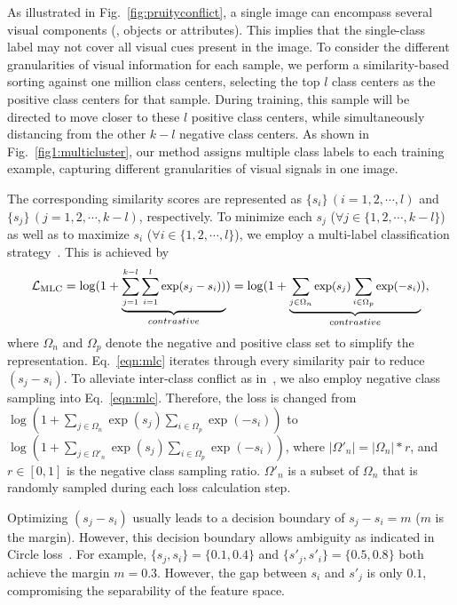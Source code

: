 As illustrated in Fig.~\ref{fig:pruityconflict}, a single image can encompass several visual components (\eg, objects or attributes). This implies that the single-class label may not cover all visual cues present in the image. 
To consider the different granularities of visual information
for each sample, we perform a similarity-based sorting against one million class centers, selecting the top $l$ class centers as the positive class centers for that sample. 
During training, this sample will be directed to move closer to these $l$ positive class centers, while simultaneously distancing from the other $k-l$ negative class centers. 
As shown in Fig.~\ref{fig1:multicluster}, our method assigns multiple class labels to each training example, capturing different granularities of visual signals in one image.

The corresponding similarity scores are represented as $\{s_i\}\, (i=1,2,\cdots,l)$ and $\{s_j\}\,(j=1,2,\cdots,k-l)$, respectively. 
To minimize each $s_j$ ($ \forall j \in \{1,2,\cdots,k-l\}$) as well as to maximize $s_i$ ($\forall i\in \{1,2,\cdots,l\}$), we employ a multi-label classification strategy~\cite{li2017improving,sun2020circle}. This is achieved by
\vspace{-2mm}
\begin{align}
\label{eqn:mlc}
\small
\mathcal{L}_\mathrm{MLC}  =  \log(1+ \underbrace{\sum_{j=1}^{k-l} \sum_{i=1}^l \exp(s_j-s_i))}_{contrastive}) 
 = \log(1+\underbrace{\sum_{j \in \Omega_{n}}\exp({s_j})\sum_{i \in \Omega_{p}}\exp({-s_i})}_{contrastive}), 
\end{align}
where $\Omega_{n}$ and $\Omega_{p}$ denote the negative and positive class set to simplify the representation. Eq.~\ref{eqn:mlc} iterates through every similarity pair to reduce $(s_j-s_i)$. To alleviate inter-class conflict as in~\cite{an2022killing,an2023unicom}, we also employ negative class sampling into Eq.~\ref{eqn:mlc}. Therefore, the loss is changed from $\log(1+\sum_{j \in \Omega_{n}}\exp({s_j})\sum_{i \in \Omega_{p}}\exp({-s_i}))$ to $\log(1+\sum_{j \in \Omega'_{n}}\exp({s_j})\sum_{i \in \Omega_{p}}\exp({-s_i}))$, where $\left |\Omega'_{n}  \right |= \left |\Omega_{n}  \right |*r$, and $r \in\left [0,1 \right ]$ is the negative class sampling ratio. $\Omega'_{n}$ is a subset of $\Omega_n$ that is randomly sampled during each loss calculation step.

Optimizing $(s_j-s_i)$ usually leads to a decision boundary of $s_j-s_i=m$ ($m$ is the margin). 
However, this decision boundary allows ambiguity as indicated in Circle loss~\cite{sun2020circle}. 
For example, $\{s_j,s_i\}=\{0.1,0.4\}$ and $\{s'_j,s'_i\}=\{0.5,0.8\}$ both achieve the margin $m=0.3$. However, the gap between $s_i$ and $s'_j$ is only $0.1$, compromising the separability of the feature space. 

